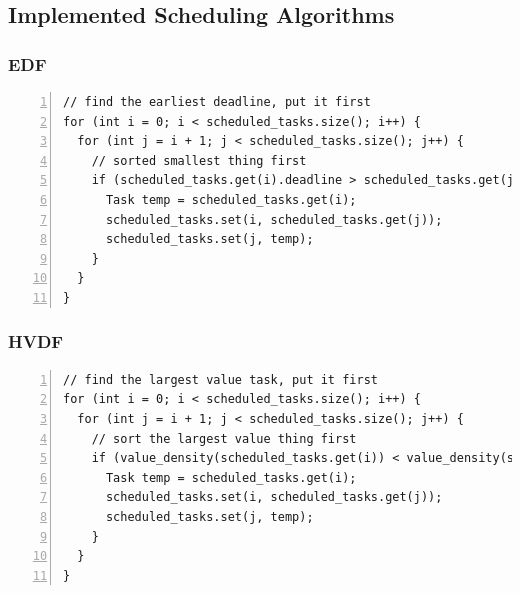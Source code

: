 \documentclass{article} %
\begin{document}
\subsection{Implemented Scheduling Algorithms}
\subsubsection{EDF}
\begin{lstlisting}[caption={EDF scheduler implementation},label={lst:ProcessorPanel},numbers=left]
// find the earliest deadline, put it first
for (int i = 0; i < scheduled_tasks.size(); i++) {
  for (int j = i + 1; j < scheduled_tasks.size(); j++) {
    // sorted smallest thing first
    if (scheduled_tasks.get(i).deadline > scheduled_tasks.get(j).deadline) {
      Task temp = scheduled_tasks.get(i);
      scheduled_tasks.set(i, scheduled_tasks.get(j));
      scheduled_tasks.set(j, temp);
    }
  }
}
\end{lstlisting}

\subsubsection{HVDF}
\begin{lstlisting}[caption={HVDF scheduler implementation},label={lst:ProcessorPanel},numbers=left]
// find the largest value task, put it first
for (int i = 0; i < scheduled_tasks.size(); i++) {
  for (int j = i + 1; j < scheduled_tasks.size(); j++) {
    // sort the largest value thing first
    if (value_density(scheduled_tasks.get(i)) < value_density(scheduled_tasks.get(j))) {
      Task temp = scheduled_tasks.get(i);
      scheduled_tasks.set(i, scheduled_tasks.get(j));
      scheduled_tasks.set(j, temp);
    }
  }
}
\end{lstlisting}

\end{document}
